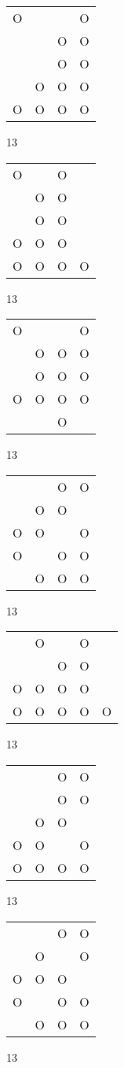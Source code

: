 \begin{tabular}{|m{0.2cm}m{0.2cm}m{0.2cm}m{0.2cm}|}\hline
O& & &O\\
 & &O&O\\
 & &O&O\\
 &O&O&O\\
O&O&O&O\\
\hline\end{tabular}13
\begin{tabular}{|m{0.2cm}m{0.2cm}m{0.2cm}m{0.2cm}|}\hline
O& &O& \\
 &O&O& \\
 &O&O& \\
O&O&O& \\
O&O&O&O\\
\hline\end{tabular}13
\begin{tabular}{|m{0.2cm}m{0.2cm}m{0.2cm}m{0.2cm}|}\hline
O& & &O\\
 &O&O&O\\
 &O&O&O\\
O&O&O&O\\
 & &O& \\
\hline\end{tabular}13
\begin{tabular}{|m{0.2cm}m{0.2cm}m{0.2cm}m{0.2cm}|}\hline
 & &O&O\\
 &O&O& \\
O&O& &O\\
O& &O&O\\
 &O&O&O\\
\hline\end{tabular}13
\begin{tabular}{|m{0.2cm}m{0.2cm}m{0.2cm}m{0.2cm}m{0.2cm}|}\hline
 &O& &O& \\
 & &O&O& \\
O&O&O&O& \\
O&O&O&O&O\\
\hline\end{tabular}13
\begin{tabular}{|m{0.2cm}m{0.2cm}m{0.2cm}m{0.2cm}|}\hline
 & &O&O\\
 & &O&O\\
 &O&O& \\
O&O& &O\\
O&O&O&O\\
\hline\end{tabular}13
\begin{tabular}{|m{0.2cm}m{0.2cm}m{0.2cm}m{0.2cm}|}\hline
 & &O&O\\
 &O& &O\\
O&O&O& \\
O& &O&O\\
 &O&O&O\\
\hline\end{tabular}13
